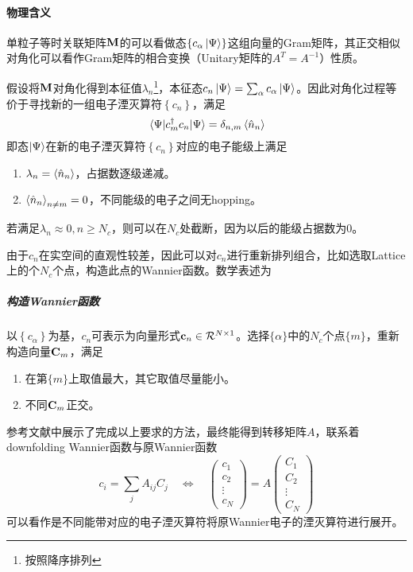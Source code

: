 \documentclass{article}
\begin{document}
	\paragraph{物理含义}单粒子等时关联矩阵$\vb{M}$的可以看做态$\left\{c_\alpha\ket{\Psi}\right\}$这组向量的Gram矩阵，其正交相似对角化可以看作Gram矩阵的相合变换（Unitary矩阵的$A^T=A^{-1}$）性质。
	
	假设将$\vb{M}$对角化得到本征值$\lambda_n$\footnote{按照降序排列}，本征态$c_n\ket{\Psi}=\sum_\alpha c_\alpha\ket{\Psi}$。因此对角化过程等价于寻找新的一组电子湮灭算符$\left\{c_n\right\}$，满足
	\begin{equation}
		\expval{c_m^\dagger c_n}{\Psi}=\delta_{n,m}\expval{\hat{n}_n}
	\end{equation}
	即态$\ket{\Psi}$在新的电子湮灭算符$\left\{c_n\right\}$对应的电子能级上满足
	\begin{enumerate}
		\item $\lambda_n=\expval{\hat{n}_n}$，占据数逐级递减。
		\item $\expval{\hat{n}_n}_{n\neq m}=0$，不同能级的电子之间无hopping。
	\end{enumerate}
	若满足$\lambda_n\approx 0,n\geq N_c $，则可以在$N_c$处截断，因为以后的能级占据数为0。
	
	由于$c_n$在实空间的直观性较差，因此可以对$c_n$进行重新排列组合，比如选取Lattice上的个$N_c$个点，构造此点的Wannier函数。数学表述为
	\subparagraph{构造Wannier函数}以$\left\{c_\alpha\right\}$为基，$c_n$可表示为向量形式$\vb{c}_n\in \mathcal{R}^{N\times1}$。选择$\{\alpha\}$中的$N_c$个点$\{m\}$，重新构造向量$\vb{C}_m$，满足
	\begin{enumerate}
		\item 在第$\{m\}$上取值最大，其它取值尽量能小。
		\item 不同$\vb{C}_m$正交。
	\end{enumerate}
	参考文献\cite{PhysRevB.108.L161111}中展示了完成以上要求的方法，最终能得到转移矩阵$A$，联系着downfolding Wannier函数与原Wannier函数
	\begin{equation}
		c_i=\sum_jA_{ij}C_j\quad \Leftrightarrow\quad \begin{pmatrix}
			c_1\\
			c_2\\
			\vdots \\
			c_N
		\end{pmatrix}=A\begin{pmatrix}
		C_1\\
		C_2\\
		\vdots \\
		C_N
		\end{pmatrix}
	\end{equation}
	可以看作是不同能带对应的电子湮灭算符将原Wannier电子的湮灭算符进行展开。
	
\end{document}
